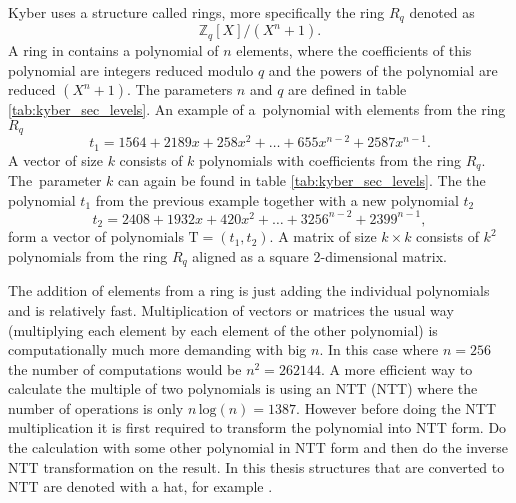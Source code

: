 Kyber uses a structure called rings, more specifically the ring $R_q$ denoted as
\begin{equation}
  \mathbb{Z}_q[X]/(X^n+1).
\end{equation}
A ring in contains a polynomial of $n$ elements, where the coefficients of this polynomial are integers reduced modulo $q$ and the powers of the polynomial are reduced $(X^n+1)$. The parameters $n$ and $q$ are defined in table \ref{tab:kyber_sec_levels}. An example of a~polynomial with elements from the ring $R_q$
\begin{equation}
  t_1 = 1564 + 2189x + 258x^2 + \dots + 655x^{n-2} + 2587x^{n-1}.
\end{equation}
A vector of size $k$ consists of $k$ polynomials with coefficients from the ring $R_q$. The~parameter $k$ can again be found in table \ref{tab:kyber_sec_levels}. The the polynomial $t_1$ from the previous example together with a new polynomial $t_2$
\begin{equation}
  t_2 = 2408 + 1932x + 420x^2 + \dots + 3256^{n-2} + 2399^{n-1},
\end{equation}
form a vector of polynomials $\mathrm{T}=(t_1, t_2)$. A matrix of size $k\times k$ consists of $k^2$ polynomials from the ring $R_q$ aligned as a square 2-dimensional matrix. \cite{YbbuGxVPF0GGTxfN}

The addition of elements from a ring is just adding the individual polynomials and is relatively fast. Multiplication of vectors or matrices the usual way (multiplying each element by each element of the other polynomial) is computationally much more demanding with big $n$. In this case where $n=256$ the number of computations would be $n^2=262144$. A more efficient way to calculate the multiple of two polynomials is using an NTT (\acl{NTT}) where the number of operations is only $n\,\mathrm{log}(n)=1387$. However before doing the NTT multiplication it is first required to transform the polynomial into NTT form. Do the calculation with some other polynomial in NTT form and then do the inverse NTT transformation on the result. In this thesis structures that are converted to NTT are denoted with a hat, for example . \cite{Liang2021}



